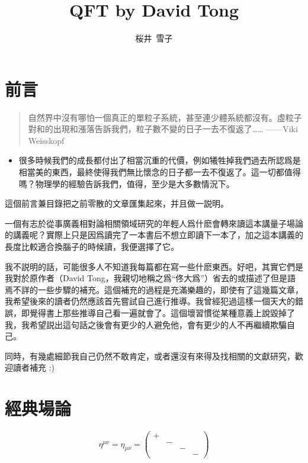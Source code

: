 \documentclass{article}
\title{QFT by David Tong}
\author{桜井\ 雪子}
\date{}
\begin{document}
\maketitle

\setcounter{section}{-1}

\section{前言}

\begin{quote}
  自然界中沒有哪怕一個真正的單粒子系統，甚至連少體系統都沒有。虛粒子對和的出現和漲落告訴我們，粒子數不變的日子一去不復返了…… ——Viki Weisskopf
\end{quote}

\begin{itemize}
  \item 很多時候我們的成長都付出了相當沉重的代價，例如犧牲掉我們過去所認爲是相當美的東西，最終使得我們無比懷念的日子都一去不復返了。這一切都值得嗎？物理學的經驗告訴我們，值得，至少是大多數情況下。
\end{itemize}

這個前言兼目錄把之前零散的文章匯集起來，并且做一説明。

一個有志於從事廣義相對論相關領域研究的年輕人爲什麽會轉來讀這本講量子場論的講義呢？實際上只是因爲讀完了一本書后不想立即讀下一本了，加之這本講義的長度比較適合換腦子的時候讀，我便選擇了它。

我不説明的話，可能很多人不知道我每篇都在寫一些什麽東西。好吧，其實它們是我對於原作者（David Tong，我親切地稱之爲“佟大爲”）省去的或描述了但是語焉不詳的一些步驟的補充。這個補充的過程是充滿樂趣的，即使有了這幾篇文章，我希望後來的讀者仍然應該首先嘗試自己進行推導。我曾經犯過這樣一個天大的錯誤，即覺得書上那些推導自己看一遍就會了。這個壞習慣從某種意義上說毀掉了我，我希望説出這句話之後會有更少的人避免他，會有更少的人不再繼續欺騙自己。

同時，有幾處細節我自己仍然不敢肯定，或者還沒有來得及找相關的文獻研究，歡迎讀者補充 :)

\section{經典場論}

$$\eta^{\mu\nu}=\eta_{\mu\nu}=
\begin{pmatrix}
+ &   &   &   \\
& - &   &   \\
&   & - &   \\
&   &   & -
\end{pmatrix}$$
\end{document}
